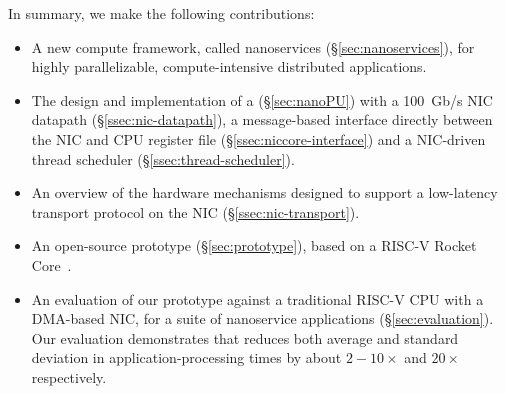 In summary, we make the following contributions:
\begin{itemize}[topsep=0.4\baselineskip, leftmargin=20pt]
    \item A new compute framework, called nanoservices (\S\ref{sec:nanoservices}), for highly parallelizable, compute-intensive distributed applications.
    \item The design and implementation of a \name{} (\S\ref{sec:nanoPU}) with a \SI{100}{Gb/s} NIC datapath (\S\ref{ssec:nic-datapath}), a message-based interface directly between the NIC and CPU register file (\S\ref{ssec:niccore-interface}) and a NIC-driven thread scheduler (\S\ref{ssec:thread-scheduler}).
    \item An overview of the hardware mechanisms designed to support a low-latency transport protocol on the NIC (\S\ref{ssec:nic-transport}).
    \item An open-source \name{} prototype (\S\ref{sec:prototype}), based on a RISC-V Rocket Core~\cite{rocket-chip}.
    \item An evaluation of our \name{} prototype against a traditional RISC-V CPU with a DMA-based NIC, for a suite of nanoservice applications (\S\ref{sec:evaluation}). Our evaluation demonstrates that \name{} reduces both average and standard deviation in application-processing times by about $2-10\times$ and $20\times$ respectively.
\end{itemize}

